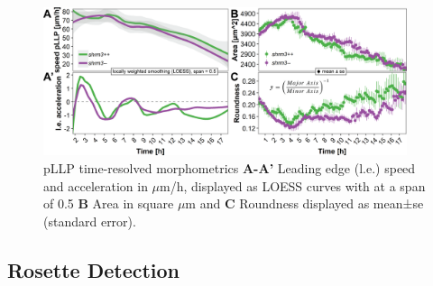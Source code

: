 \documentclass[11pt,singlespacinge,twoside]{reedthesis} %
\begin{document}
\begin{figure}

{\centering \includegraphics[width=0.95\textwidth]{figures/results/03_rosettes/registration} 

}

\caption[pLLP time-resolved morphometrics]{pLLP time-resolved morphometrics \textbf{A-A'} Leading edge (l.e.) speed and acceleration in \(\mu\)m/h, displayed as LOESS curves with at a span of 0.5 \textbf{B} Area in square \(\mu\)m and \textbf{C} Roundness displayed as mean±se (standard error).}\label{fig:rdtreg}
\end{figure}
\hypertarget{res-rdtdet}{%
\subsection{Rosette Detection}\label{res-rdtdet}}
\end{document}
